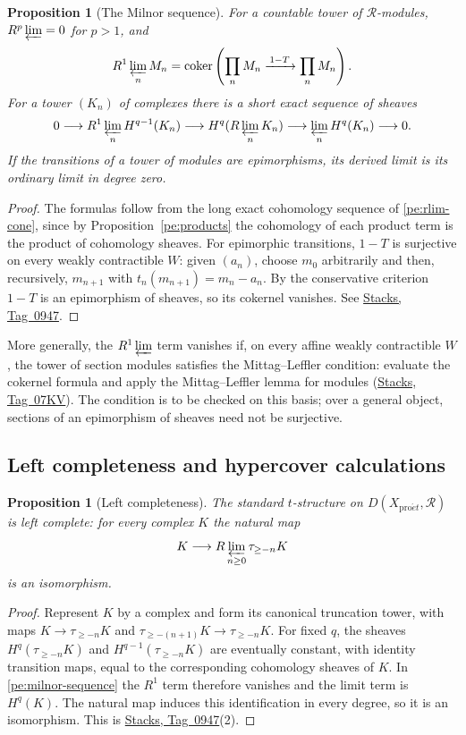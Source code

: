 \documentclass[11pt,a4paper]{article}
\numberwithin{equation}{section}
\newtheorem{proposition}[theorem]{Proposition}
\theoremstyle{definition}
\theoremstyle{remark}
\newcommand{\proet}{\mathrm{pro}\acute{e}t}
\newcommand{\coker}{\operatorname{coker}}
\newcommand{\stacks}[1]{\href{https://stacks.math.columbia.edu/tag/#1}{\textnormal{Stacks, Tag~#1}}}
\begin{document}
\begin{proposition}[The Milnor sequence]\label{pe:milnor}
For a countable tower of $\mathcal R$-modules, $R^p\varprojlim=0$
for $p>1$, and
\[
 R^1\varprojlim_n M_n
 =\coker\left(\prod_n M_n\xrightarrow{\,1-T\,}\prod_n M_n\right).
\]
For a tower $(K_n)$ of complexes there is a short exact sequence of
sheaves
\begin{equation}\label{pe:milnor-sequence}
 0\longrightarrow R^1\varprojlim_n H^{q-1}(K_n)
 \longrightarrow H^q(R\varprojlim_nK_n)
 \longrightarrow \varprojlim_n H^q(K_n)
 \longrightarrow 0.
\end{equation}
If the transitions of a tower of modules are epimorphisms, its derived
limit is its ordinary limit in degree zero.
\end{proposition}
\begin{proof}
The formulas follow from the long exact cohomology sequence of
\eqref{pe:rlim-cone}, since by Proposition~\ref{pe:products} the
cohomology of each product term is the product of cohomology sheaves.
For epimorphic transitions, $1-T$ is surjective on every weakly
contractible $W$: given $(a_n)$, choose $m_0$ arbitrarily and then,
recursively, $m_{n+1}$ with $t_n(m_{n+1})=m_n-a_n$. By the
conservative criterion $1-T$ is an epimorphism of sheaves, so its
cokernel vanishes. See \stacks{0947}.
\end{proof}

More generally, the $R^1\varprojlim$ term vanishes if, on every affine
weakly contractible $W$, the tower of section modules satisfies the
Mittag--Leffler condition: evaluate the cokernel formula and apply the
Mittag--Leffler lemma for modules (\stacks{07KV}). The condition is
to be checked on this basis; over a general object, sections of an
epimorphism of sheaves need not be surjective.

\subsection{Left completeness and hypercover calculations}

\begin{proposition}[Left completeness]\label{pe:left-complete}
The standard $t$-structure on $D(X_{\proet},\mathcal R)$ is left complete:
for every complex $K$ the natural map
\[
 K\longrightarrow R\varprojlim_{n\geq0}\tau_{\geq-n}K
\]
is an isomorphism.
\end{proposition}
\begin{proof}
Represent $K$ by a complex and form its canonical truncation tower,
with maps $K\to\tau_{\geq-n}K$ and
$\tau_{\geq-(n+1)}K\to\tau_{\geq-n}K$. For fixed $q$, the sheaves
$H^q(\tau_{\geq-n}K)$ and $H^{q-1}(\tau_{\geq-n}K)$ are eventually
constant, with identity transition maps, equal to the corresponding
cohomology sheaves of $K$. In \eqref{pe:milnor-sequence} the $R^1$
term therefore vanishes and the limit term is $H^q(K)$. The natural
map induces this identification in every degree, so it is an
isomorphism. This is \stacks{0947}(2).
\end{proof}
\end{document}
